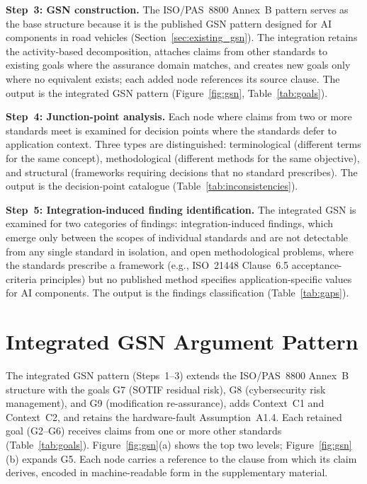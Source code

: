 \documentclass[runningheads]{llncs}
\begin{document}
	\textbf{Step~3: GSN construction.} The ISO/PAS~8800 Annex~B pattern serves as the base structure because it is the published GSN pattern designed for AI components in road vehicles (Section~\ref{sec:existing_gsn}). The integration retains the activity-based decomposition, attaches claims from other standards to existing goals where the assurance domain matches, and creates new goals only where no equivalent exists; each added node references its source clause. The output is the integrated GSN pattern (Figure~\ref{fig:gsn}, Table~\ref{tab:goals}).
	
	\textbf{Step~4: Junction-point analysis.} Each node where claims from two or more standards meet is examined for decision points where the standards defer to application context. Three types are distinguished: terminological (different terms for the same concept), methodological (different methods for the same objective), and structural (frameworks requiring decisions that no standard prescribes). The output is the decision-point catalogue (Table~\ref{tab:inconsistencies}).
	
	\textbf{Step~5: Integration-induced finding identification.} The integrated GSN is examined for two categories of findings: integration-induced findings, which emerge only between the scopes of individual standards and are not detectable from any single standard in isolation, and open methodological problems, where the standards prescribe a framework (e.g., ISO~21448 Clause~6.5 acceptance-criteria principles) but no published method specifies application-specific values for AI components. The output is the findings classification (Table~\ref{tab:gaps}).
	
	\FloatBarrier
	\section{Integrated GSN Argument Pattern}
	\label{sec:gsn}
	
	The integrated GSN pattern (Steps~1--3) extends the ISO/PAS~8800 Annex~B structure with the goals G7 (SOTIF residual risk), G8 (cybersecurity risk management), and G9 (modification re-assurance), adds Context~C1 and Context~C2, and retains the hardware-fault Assumption~A1.4. Each retained goal (G2--G6) receives claims from one or more other standards (Table~\ref{tab:goals}). Figure~\ref{fig:gsn}(a) shows the top two levels; Figure~\ref{fig:gsn}(b) expands G5. Each node carries a reference to the clause from which its claim derives, encoded in machine-readable form in the supplementary material.
	
\end{document}
